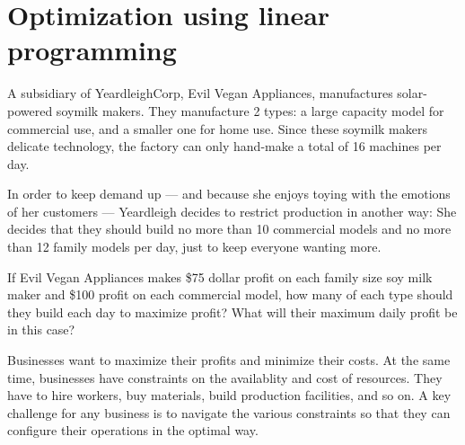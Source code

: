 
\section{Optimization using linear programming}
\label{sec:linearprogramming}

\begin{boxedexplore}
A subsidiary of YeardleighCorp, Evil Vegan Appliances, manufactures solar-powered soymilk makers. They manufacture 2 types: a large capacity model for commercial use, and a smaller one for home use. Since these soymilk makers delicate technology, the factory can only hand-make a total of 16 machines per day.

In order to keep demand up --- and because she enjoys toying with the emotions of her customers --- Yeardleigh decides to restrict production in another way: She decides that they should build no more than 10 commercial models and no more than 12 family models per day, just to keep everyone wanting more.

If Evil Vegan Appliances makes \$75 dollar profit on each family size soy milk maker and \$100 profit on each commercial model, how many of each type should they build each day to maximize profit? What will their maximum daily profit be in this case?
\end{boxedexplore}

Businesses want to maximize their profits and minimize their costs. At the same time, businesses have constraints on the availablity and cost of resources. They have to hire workers, buy materials, build production facilities, and so on. A key challenge for any business is to navigate the various constraints so that they can configure their operations in the optimal way.

